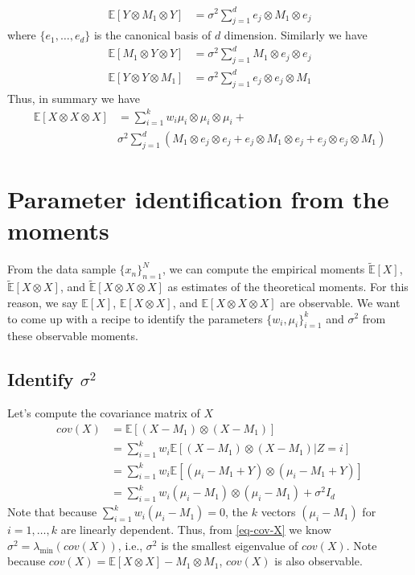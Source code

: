 \documentclass{article}
\begin{document}
\begin{align}
\mathbb{E}[ Y\otimes M_1\otimes Y] &= \sigma^2\sum_{j=1}^d e_j \otimes M_1 \otimes e_j
\end{align}
where $\{e_1,\ldots,e_d\}$ is the canonical basis of $d$ dimension. Similarly we have
\begin{align}
\mathbb{E}[ M_1 \otimes Y\otimes Y] &= \sigma^2\sum_{j=1}^d  M_1 \otimes e_j \otimes e_j\\
\mathbb{E}[Y\otimes Y\otimes M_1] &= \sigma^2\sum_{j=1}^d   e_j \otimes e_j \otimes M_1
\end{align}
Thus, in summary we have
\begin{align}
\mathbb{E}[X\otimes X \otimes X]&=\sum_{i=1}^k w_i \mu_i\otimes \mu_i\otimes \mu_i +\\
\nonumber
&\sigma^2\sum_{j=1}^d  (M_1 \otimes e_j \otimes e_j + e_j \otimes M_1 \otimes e_j + e_j \otimes e_j \otimes M_1)
\end{align}
\section{Parameter identification from the moments}
From the data sample $\{x_n\}_{n=1}^N$, we can compute the empirical moments $\widetilde{\mathbb{E}}[X]$, $\widetilde{\mathbb{E}}[X\otimes X]$, and $\widetilde{\mathbb{E}}[X\otimes X \otimes X]$ as estimates of the theoretical moments. For this reason, we say $\mathbb{E}[X]$, $\mathbb{E}[X\otimes X]$, and $\mathbb{E}[X\otimes X \otimes X]$ are observable. We want to come up with a recipe to identify the parameters $\{w_i,\mu_i\}_{i=1}^k$ and $\sigma^2$ from these observable moments.
\subsection{Identify $\sigma^2$}
Let's compute the covariance matrix of $X$
\begin{align}
cov(X)&=\mathbb{E}[(X-M_1)\otimes (X-M_1)]\\
&=\sum_{i=1}^k w_i \mathbb{E}[(X-M_1)\otimes (X-M_1)|Z=i]\\
&=\sum_{i=1}^k w_i \mathbb{E}[(\mu_i-M_1+Y)\otimes (\mu_i-M_1+Y)]\\
&=\sum_{i=1}^k w_i (\mu_i-M_1)\otimes (\mu_i-M_1) + \sigma^2 I_d
\label{eq-cov-X}
\end{align}
Note that because $\sum_{i=1}^k w_i (\mu_i-M_1)=0$, the $k$ vectors $(\mu_i-M_1)$ for $i=1,\ldots,k$ are linearly dependent. Thus, from \eqref{eq-cov-X} we know $\sigma^2=\lambda_{\min}(cov(X))$, i.e., $\sigma^2$ is the smallest eigenvalue of $cov(X)$. Note because $cov(X)=\mathbb{E}[X\otimes X]-M_1\otimes M_1$, $cov(X)$ is also observable.
\end{document}
